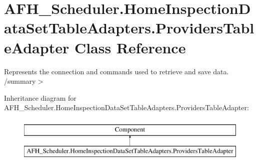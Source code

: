 \section{A\+F\+H\+\_\+\+Scheduler.\+Home\+Inspection\+Data\+Set\+Table\+Adapters.\+Providers\+Table\+Adapter Class Reference}
\label{class_a_f_h___scheduler_1_1_home_inspection_data_set_table_adapters_1_1_providers_table_adapter}


Represents the connection and commands used to retrieve and save data. /summary$>$  


Inheritance diagram for A\+F\+H\+\_\+\+Scheduler.\+Home\+Inspection\+Data\+Set\+Table\+Adapters.\+Providers\+Table\+Adapter\+:\begin{figure}[H]
\begin{center}
\leavevmode
\includegraphics[height=2.000000cm]{class_a_f_h___scheduler_1_1_home_inspection_data_set_table_adapters_1_1_providers_table_adapter}
\end{center}
\end{figure}
